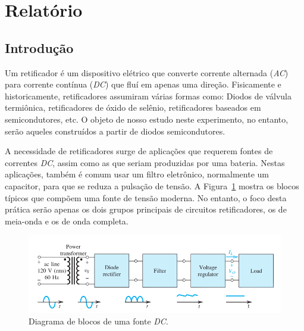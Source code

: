 \documentclass[12pt,a4paper]{article}
\begin{document}
\setcounter{figure}{2}
\setcounter{section}{3}
\setcounter{table}{2}
\setcounter{page}{5}
\section{Relatório}
\subsection{Introdução}
Um retificador é um dispositivo elétrico que converte corrente alternada (\emph{AC}) para corrente contínua (\emph{DC}) que fluí em apenas uma direção. Fisicamente e historicamente, retificadores assumiram várias formas como: Diodos de válvula termiônica, retificadores de óxido de selênio,  retificadores baseados em semicondutores, etc. O objeto de nosso estudo neste experimento, no entanto, serão aqueles construídos a partir de diodos semicondutores.

A necessidade de retificadores surge de aplicações que requerem fontes de correntes \emph{DC}, assim como as que seriam produzidas por uma bateria. Nestas aplicações, também é comum usar um filtro eletrônico, normalmente um capacitor, para que se reduza a pulsação de tensão. A Figura~\ref{fig:esquema_tensao} mostra os blocos típicos que compõem uma fonte de tensão moderna. No entanto, o foco desta prática serão apenas os dois grupos principais de circuitos retificadores, os de meia-onda e os de onda completa.  
\begin{figure}[htpb]
  \centering
  \includegraphics[width=0.8\linewidth]{./blocotransformador.pdf}
  \caption{Diagrama de blocos de uma fonte \emph{DC}.}
  \label{fig:esquema_tensao}
\end{figure}
\end{document}
